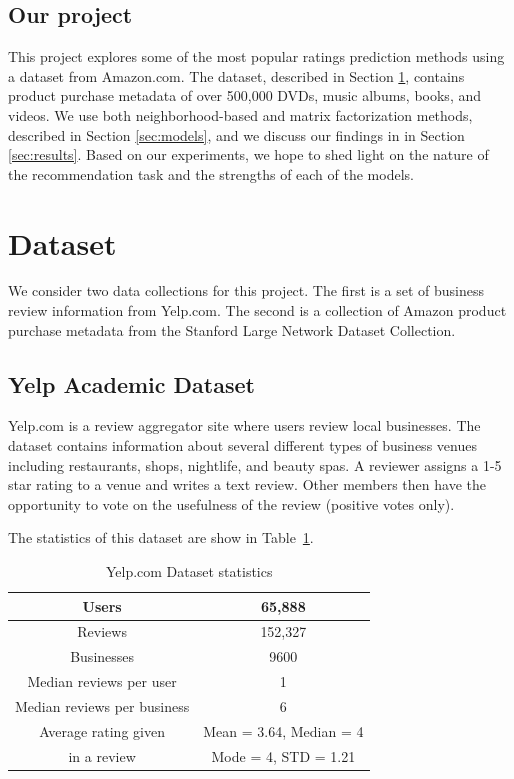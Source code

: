 \documentclass[letterpaper, 11 pt, conference]{ieeeconf}
\begin{document}
\subsection{Our project}
This project explores some of the most popular ratings prediction methods using 
a dataset from Amazon.com. The dataset, described in Section 
\ref{sec:dataset}, contains product purchase metadata of over 500,000 DVDs, 
music albums, books, and videos. We use both neighborhood-based and 
matrix factorization methods, described in Section \ref{sec:models}, and we 
discuss our findings in in Section \ref{sec:results}. Based on our 
experiments, we hope to shed light on the nature of the recommendation 
task and the strengths of each of the models.


\section{Dataset}
\label{sec:dataset}
We consider two data collections for this project. The first is a set of business
review information from Yelp.com. The second is a collection of Amazon product 
purchase metadata from the Stanford Large Network Dataset Collection.

\subsection{Yelp Academic Dataset}
Yelp.com is a review aggregator site where users review local
businesses. The dataset contains information about several different types of
business venues including restaurants, shops,
nightlife, and beauty spas. A reviewer assigns a 1-5 star rating to a venue and
writes a text review. Other members then have the opportunity to vote on the
usefulness of the review (positive votes only).

The statistics of this dataset are show in Table~\ref{table:yelpstats}.

\begin{table}[htb]
\centering
\begin{tabular}{|c|c|}
\hline
Users &65,888 \tabularnewline \hline
Reviews &152,327 \tabularnewline \hline
Businesses &9600 \tabularnewline \hline
Median reviews per user & 1
\tabularnewline \hline
Median reviews per business &  6
\tabularnewline \hline
Average rating given &Mean = 3.64, Median = 4 \tabularnewline
in a review &Mode = 4, STD = 1.21 
\tabularnewline \hline

\end{tabular}
\caption{ Yelp.com Dataset statistics }
\label{table:yelpstats}
\end{table}
\end{document}

